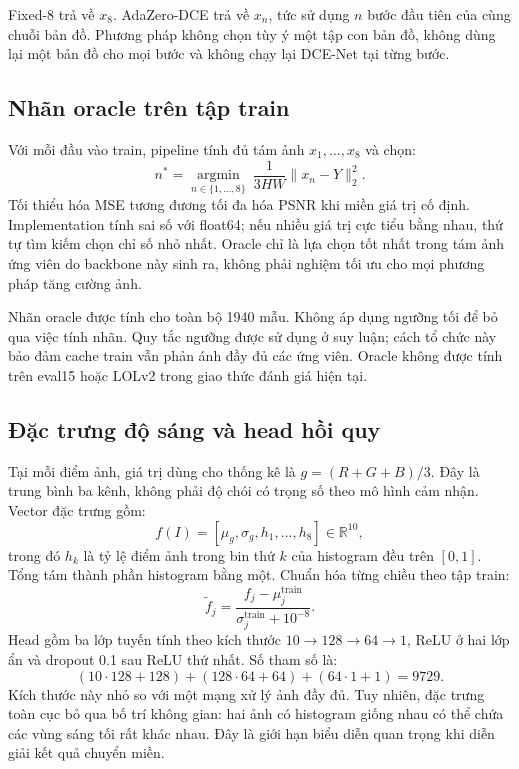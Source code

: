 Fixed-8 trả về $x_8$. AdaZero-DCE trả về $x_n$, tức sử dụng $n$ bước đầu tiên của cùng chuỗi bản đồ. Phương pháp không chọn tùy ý một tập con bản đồ, không dùng lại một bản đồ cho mọi bước và không chạy lại DCE-Net tại từng bước.

\subsection{Nhãn oracle trên tập train}
Với mỗi đầu vào train, pipeline tính đủ tám ảnh $x_1,\ldots,x_8$ và chọn:
\begin{equation}
n^*=\underset{n\in\{1,\ldots,8\}}{\operatorname{argmin}}\ \frac{1}{3HW}\|x_n-Y\|_2^2.
\end{equation}
Tối thiểu hóa MSE tương đương tối đa hóa PSNR khi miền giá trị cố định. Implementation tính sai số với float64; nếu nhiều giá trị cực tiểu bằng nhau, thứ tự tìm kiếm chọn chỉ số nhỏ nhất. Oracle chỉ là lựa chọn tốt nhất trong tám ảnh ứng viên do backbone này sinh ra, không phải nghiệm tối ưu cho mọi phương pháp tăng cường ảnh.

Nhãn oracle được tính cho toàn bộ 1940 mẫu. Không áp dụng ngưỡng tối để bỏ qua việc tính nhãn. Quy tắc ngưỡng được sử dụng ở suy luận; cách tổ chức này bảo đảm cache train vẫn phản ánh đầy đủ các ứng viên. Oracle không được tính trên eval15 hoặc LOLv2 trong giao thức đánh giá hiện tại.

\subsection{Đặc trưng độ sáng và head hồi quy}
Tại mỗi điểm ảnh, giá trị dùng cho thống kê là $g=(R+G+B)/3$. Đây là trung bình ba kênh, không phải độ chói có trọng số theo mô hình cảm nhận. Vector đặc trưng gồm:
\begin{equation}
f(I)=[\mu_g,\sigma_g,h_1,\ldots,h_8]\in\mathbb{R}^{10},
\end{equation}
trong đó $h_k$ là tỷ lệ điểm ảnh trong bin thứ $k$ của histogram đều trên $[0,1]$. Tổng tám thành phần histogram bằng một. Chuẩn hóa từng chiều theo tập train:
\begin{equation}
\widetilde f_j=\frac{f_j-\mu_j^{\mathrm{train}}}{\sigma_j^{\mathrm{train}}+10^{-8}}.
\end{equation}
Head gồm ba lớp tuyến tính theo kích thước $10\rightarrow128\rightarrow64\rightarrow1$, ReLU ở hai lớp ẩn và dropout 0.1 sau ReLU thứ nhất. Số tham số là:
\begin{equation}
(10\cdot128+128)+(128\cdot64+64)+(64\cdot1+1)=9729.
\end{equation}
Kích thước này nhỏ so với một mạng xử lý ảnh đầy đủ. Tuy nhiên, đặc trưng toàn cục bỏ qua bố trí không gian: hai ảnh có histogram giống nhau có thể chứa các vùng sáng tối rất khác nhau. Đây là giới hạn biểu diễn quan trọng khi diễn giải kết quả chuyển miền.

